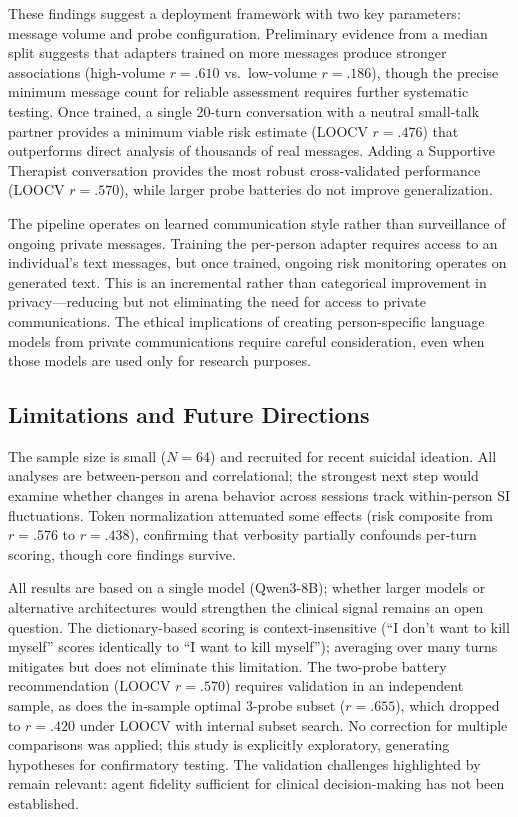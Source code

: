 \documentclass[review,12pt,authoryear]{elsarticle}
\begin{document}
These findings suggest a deployment framework with two key parameters: message volume and probe configuration. Preliminary evidence from a median split suggests that adapters trained on more messages produce stronger associations (high-volume $r = .610$ vs.\ low-volume $r = .186$), though the precise minimum message count for reliable assessment requires further systematic testing. Once trained, a single 20-turn conversation with a neutral small-talk partner provides a minimum viable risk estimate (LOOCV $r = .476$) that outperforms direct analysis of thousands of real messages. Adding a Supportive Therapist conversation provides the most robust cross-validated performance (LOOCV $r = .570$), while larger probe batteries do not improve generalization.

The pipeline operates on learned communication style rather than surveillance of ongoing private messages. Training the per-person adapter requires access to an individual's text messages, but once trained, ongoing risk monitoring operates on generated text. This is an incremental rather than categorical improvement in privacy---reducing but not eliminating the need for access to private communications. The ethical implications of creating person-specific language models from private communications require careful consideration, even when those models are used only for research purposes.

\subsection{Limitations and Future Directions}

The sample size is small ($N = 64$) and recruited for recent suicidal ideation. All analyses are between-person and correlational; the strongest next step would examine whether changes in arena behavior across sessions track within-person SI fluctuations. Token normalization attenuated some effects (risk composite from $r = .576$ to $r = .438$), confirming that verbosity partially confounds per-turn scoring, though core findings survive.

All results are based on a single model (Qwen3-8B); whether larger models or alternative architectures would strengthen the clinical signal remains an open question. The dictionary-based scoring is context-insensitive (``I don't want to kill myself'' scores identically to ``I want to kill myself''); averaging over many turns mitigates but does not eliminate this limitation. The two-probe battery recommendation (LOOCV $r = .570$) requires validation in an independent sample, as does the in-sample optimal 3-probe subset ($r = .655$), which dropped to $r = .420$ under LOOCV with internal subset search. No correction for multiple comparisons was applied; this study is explicitly exploratory, generating hypotheses for confirmatory testing. The validation challenges highlighted by \citet{tornberg2025validation} remain relevant: agent fidelity sufficient for clinical decision-making has not been established.
\end{document}
